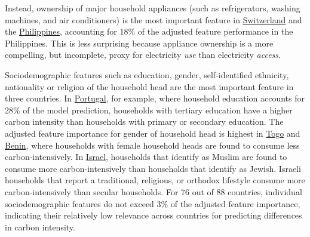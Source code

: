 \documentclass[12pt, a4paper]{article}
\begin{document}
Instead, ownership of major household appliances (such as refrigerators, washing machines, and air conditioners) is the most important feature in \hyperref[fig:5b_CHE]{Switzerland} and the \hyperref[fig:5b_PHL]{Philippines}, accounting for 18\% of the adjusted feature performance in the Philippines. This is less surprising because appliance ownership is a more compelling, but incomplete, proxy for electricity \textit{use} than electricity \textit{access}.

Sociodemographic features such as education, gender, self-identified ethnicity, nationality or religion of the household head are the most important feature in three countries. In \hyperref[fig:5b_PRT]{Portugal}, for example, where household education accounts for 28\% of the model prediction, households with tertiary education have a higher carbon intensity than households with primary or secondary education. The adjusted feature importance for gender of household head is highest in \hyperref[fig:5b_TGO]{Togo} and \hyperref[fig:5b_BEN]{Benin}, where households with female household heads are found to consume less carbon-intensively. In \hyperref[fig:5b_ISR]{Israel}, households that identify as Muslim are found to consume more carbon-intensively than households that identify as Jewish. Israeli households that report a traditional, religious, or orthodox lifestyle consume more carbon-intensively than secular households. For 76 out of 88 countries, individual sociodemographic features do not exceed 3\% of the adjusted feature importance, indicating their relatively low relevance across countries for predicting differences in carbon intensity.
\end{document}
